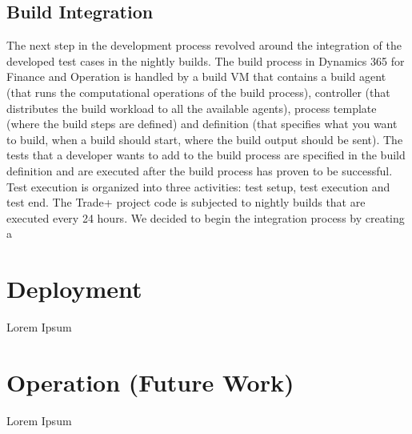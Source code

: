 \subsection{Build Integration}

The next step in the development process revolved around the integration of the developed test cases in the nightly builds. The build process in Dynamics 365 for Finance and Operation is handled by a build VM that contains a build agent (that runs the computational operations of the build process), controller (that distributes the build workload to all the available agents), process template (where the build steps are defined) and definition (that specifies what you want to build, when a build should start, where the build output should be sent). The tests that a developer wants to add to the build process are specified in the build definition and are executed after the build process has proven to be successful. Test execution is organized into three activities: test setup, test execution and test end. The Trade+ project code is subjected to nightly builds that are executed every 24 hours. We decided to begin the integration process by creating a 

\section{Deployment}

Lorem Ipsum

\section{Operation (Future Work)} 

Lorem Ipsum